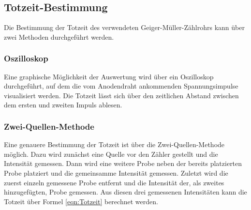 \documentclass[titlepage = firstcover]{scrartcl}
\begin{document}
        \newpage
        \subsection{Totzeit-Bestimmung}
            Die Bestimmung der Totzeit des verwendeten Geiger-Müller-Zählrohrs kann über zwei Methoden durchgeführt werden.
            
            \subsubsection*{Oszilloskop}
                Eine graphische Möglichkeit der Auswertung wird über ein Oszilloskop durchgeführt, auf dem die vom Anodendraht ankommenden Spannungsimpulse visualisiert werden. Die Totzeit 
                lässt sich über den zeitlichen Abstand zwischen dem ersten und zweiten Impuls ablesen.
                
            \subsubsection*{Zwei-Quellen-Methode}
                Eine genauere Bestimmung der Totzeit ist über die Zwei-Quellen-Methode möglich. Dazu wird zunächst eine Quelle vor den Zähler gestellt und die Intensität gemessen. Dann wird eine
                weitere Probe neben der bereits platzierten Probe platziert und die gemeinsamme Intensität gemessen. Zuletzt wird die zuerst einzeln gemessene Probe entfernt und die Intensität
                der, als zweites hinzugefügten, Probe gemessen. Aus diesen drei gemessenen Intensitäten kann die Totzeit über Formel \ref{eqn:Totzeit} berechnet werden.

                \FloatBarrier
\end{document}
